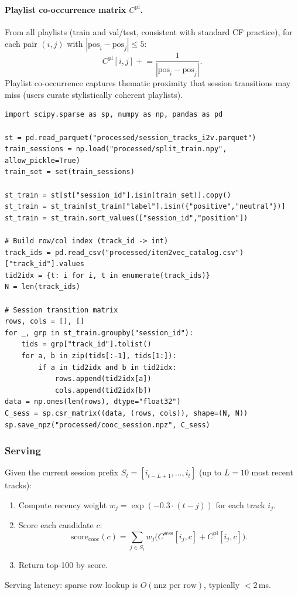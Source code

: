 \documentclass[11pt]{article}
\begin{document}
\paragraph{Playlist co-occurrence matrix $C^{\text{pl}}$.}
From all playlists (train and val/test, consistent with standard CF practice),
for each pair $(i, j)$ with $|\text{pos}_i - \text{pos}_j| \le 5$:
\[
  C^{\text{pl}}[i, j] \mathrel{+}= \frac{1}{|\text{pos}_i - \text{pos}_j|}.
\]
Playlist co-occurrence captures thematic proximity that session transitions
may miss (users curate stylistically coherent playlists).

\begin{lstlisting}
import scipy.sparse as sp, numpy as np, pandas as pd

st = pd.read_parquet("processed/session_tracks_i2v.parquet")
train_sessions = np.load("processed/split_train.npy", allow_pickle=True)
train_set = set(train_sessions)

st_train = st[st["session_id"].isin(train_set)].copy()
st_train = st_train[st_train["label"].isin({"positive","neutral"})]
st_train = st_train.sort_values(["session_id","position"])

# Build row/col index (track_id -> int)
track_ids = pd.read_csv("processed/item2vec_catalog.csv")["track_id"].values
tid2idx = {t: i for i, t in enumerate(track_ids)}
N = len(track_ids)

# Session transition matrix
rows, cols = [], []
for _, grp in st_train.groupby("session_id"):
    tids = grp["track_id"].tolist()
    for a, b in zip(tids[:-1], tids[1:]):
        if a in tid2idx and b in tid2idx:
            rows.append(tid2idx[a])
            cols.append(tid2idx[b])
data = np.ones(len(rows), dtype="float32")
C_sess = sp.csr_matrix((data, (rows, cols)), shape=(N, N))
sp.save_npz("processed/cooc_session.npz", C_sess)
\end{lstlisting}

\subsubsection{Serving}

Given the current session prefix $S_t = [i_{t-L+1}, \ldots, i_t]$
(up to $L = 10$ most recent tracks):
\begin{enumerate}
  \item Compute recency weight $w_j = \exp(-0.3 \cdot (t - j))$ for each track $i_j$.
  \item Score each candidate $c$:
        \[
          \text{score}_{\text{cooc}}(c) =
            \sum_{j \in S_t} w_j
            \bigl(
 C^{\text{sess}}[i_j, c]
              + C^{\text{pl}}[i_j, c]
            \bigr).
        \]
  \item Return top-100 by score.
\end{enumerate}
Serving latency: sparse row lookup is $O(\text{nnz per row})$, typically $< 2$\,ms.
\end{document}
